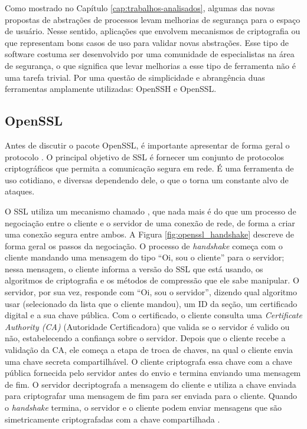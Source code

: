 Como mostrado no Capítulo \ref{cap:trabalhos-analisados}, algumas das novas
propostas de abstrações de processos levam melhorias de segurança para o espaço
de usuário. Nesse sentido, aplicações que envolvem mecanismos de criptografia ou
que  representam bons casos de uso para
validar novas abstrações. Esse tipo de software costuma ser desenvolvido por
uma comunidade de especialistas na área de segurança, o que significa que levar
melhorias a esse tipo de ferramenta não é uma tarefa trivial.  Por uma questão de simplicidade e
abrangência  duas ferramentas amplamente utilizadas: OpenSSH e
OpenSSL.

\subsection{OpenSSL}
\label{sec:openssl}

Antes de discutir o pacote OpenSSL, é importante apresentar de forma geral o
protocolo . O principal objetivo de
SSL é fornecer um conjunto de protocolos criptográficos que permita a
comunicação segura em rede. É uma ferramenta de uso
cotidiano, e diversas dependendo dele,
o que o torna um constante alvo de ataques.

O SSL utiliza um mecanismo chamado , que
nada mais é do que um processo de negociação entre o cliente e o servidor de uma conexão de rede, de
forma a criar uma conexão segura entre ambos. A Figura
\ref{fig:openssl_handshake} descreve de forma geral os passos da negociação. O
processo de \textit{handshake} começa com o cliente mandando uma mensagem do
tipo ``Oi, sou o cliente'' para o servidor; nessa mensagem, o cliente informa a
versão do SSL que está usando, os algoritmos de criptografia e os métodos de
compressão que ele sabe manipular. O servidor, por sua vez, responde com ``Oi, sou o
servidor'', dizendo qual algoritmo usar (selecionado da lista que o cliente
mandou), um ID da seção, um certificado digital e a sua chave pública. Com o
certificado, o cliente consulta uma \textit{Certificate Authority (CA)}
(Autoridade Certificadora) que valida se o servidor é valido ou não,
estabelecendo a confiança sobre o servidor. Depois que o cliente recebe a
validação da CA, ele começa a etapa de troca de chaves, na qual o cliente envia
uma chave secreta compartilhável. O cliente criptografa essa chave com a chave
pública fornecida pelo servidor antes do envio e termina enviando uma mensagem de
fim. O servidor decriptografa a mensagem do cliente e utiliza a chave enviada
para criptografar uma mensagem de fim para ser enviada para o cliente. Quando
o \textit{handshake} termina, o servidor e o cliente podem enviar mensagens que
são simetricamente criptografadas com a chave compartilhada \citep{openssl}.

